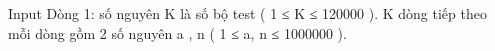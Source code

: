 Input
Dòng 1: số nguyên K là số bộ test ( 1 ≤ K ≤ 120000 ). K dòng tiếp theo mỗi dòng gồm 2 số nguyên a , n ( 1 ≤ a, n ≤ 1000000 ).